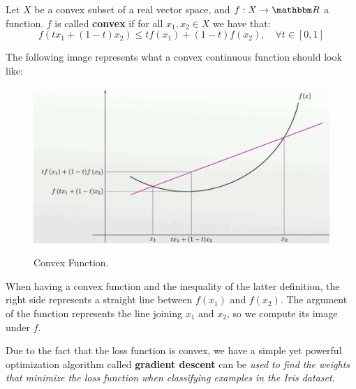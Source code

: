 \documentclass[../machine_learning_scikit.tex]{subfiles}
\begin{document}
    \begin{mydef}
        Let $X$ be a convex subset of a real vector space, and $\cf{f}{X}{\bbm{R}}$ a function. $f$ is called \textbf{convex} if for all $x_1,x_2\in X$ we have that:
        \begin{equation*}
            f\left(tx_1+(1-t)x_2 \right)\leq tf\left(x_1\right)+(1-t)f\left(x_2\right),\quad\forall t\in[0,1]
        \end{equation*}
    \end{mydef}

    The following image represents what a convex continuous function should look like:

    \begin{figure}[h]
        \begin{minipage}{\textwidth}
            \centering
            \includegraphics[scale=0.5]{images/convex_function_image.png} \\
            \caption{Convex Function.}
            \label{figure:convex_function}
        \end{minipage}
    \end{figure}

    \begin{obs}
        When having a convex function and the inequality of the latter definition, the right side represents a straight line between $f(x_1)$ and $f(x_2)$. The argument of the function represents the line joining $x_1$ and $x_2$, so we compute its image under $f$.
    \end{obs}

    Due to the fact that the loss function is convex, we have a simple yet powerful optimization algorithm called \textbf{gradient descent} can be \textit{used to find the weights that minimize the loss function when classifying examples in the Iris dataset}.
\end{document}
